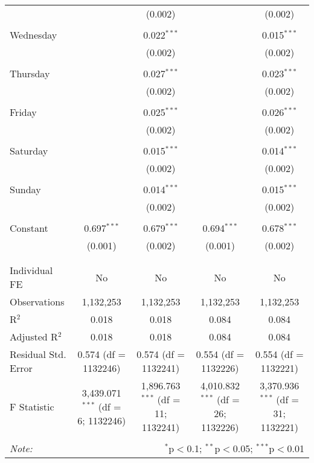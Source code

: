 \documentclass[
]{article}
\begin{document}
\begin{table}[!htbp]
{\begin{tabular}{@{\extracolsep{5pt}}lcccc}
  &  & (0.002) &  & (0.002) \\ 
  & & & & \\ 
 Wednesday &  & 0.022$^{***}$ &  & 0.015$^{***}$ \\ 
  &  & (0.002) &  & (0.002) \\ 
  & & & & \\ 
 Thursday &  & 0.027$^{***}$ &  & 0.023$^{***}$ \\ 
  &  & (0.002) &  & (0.002) \\ 
  & & & & \\ 
 Friday &  & 0.025$^{***}$ &  & 0.026$^{***}$ \\ 
  &  & (0.002) &  & (0.002) \\ 
  & & & & \\ 
 Saturday &  & 0.015$^{***}$ &  & 0.014$^{***}$ \\ 
  &  & (0.002) &  & (0.002) \\ 
  & & & & \\ 
 Sunday &  & 0.014$^{***}$ &  & 0.015$^{***}$ \\ 
  &  & (0.002) &  & (0.002) \\ 
  & & & & \\ 
 Constant & 0.697$^{***}$ & 0.679$^{***}$ & 0.694$^{***}$ & 0.678$^{***}$ \\ 
  & (0.001) & (0.002) & (0.001) & (0.002) \\ 
  & & & & \\ 
\hline \\[-1.8ex] 
Individual FE & No & No & No & No \\ 
Observations & 1,132,253 & 1,132,253 & 1,132,253 & 1,132,253 \\ 
R$^{2}$ & 0.018 & 0.018 & 0.084 & 0.084 \\ 
Adjusted R$^{2}$ & 0.018 & 0.018 & 0.084 & 0.084 \\ 
Residual Std. Error & 0.574 (df = 1132246) & 0.574 (df = 1132241) & 0.554 (df = 1132226) & 0.554 (df = 1132221) \\ 
F Statistic & 3,439.071$^{***}$ (df = 6; 1132246) & 1,896.763$^{***}$ (df = 11; 1132241) & 4,010.832$^{***}$ (df = 26; 1132226) & 3,370.936$^{***}$ (df = 31; 1132221) \\ 
\hline 
\hline \\[-1.8ex] 
\textit{Note:}  & \multicolumn{4}{r}{$^{*}$p$<$0.1; $^{**}$p$<$0.05; $^{***}$p$<$0.01} \\ 
\end{tabular}
} 
\end{table} 
\newpage
\end{document}
